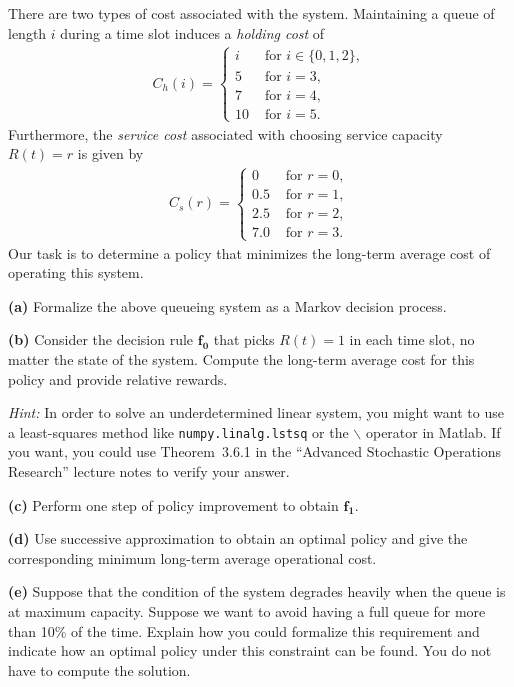 \documentclass{article}
\begin{document}
\noindent
There are two types of cost associated with the system.
Maintaining a queue of length $i$ during a time slot induces a \textit{holding cost} of 
\begin{align*}
    C_h(i) = \begin{cases}
        i & \text{ for } i \in \{ 0, 1, 2 \}, \\
        5 & \text{ for } i = 3, \\
        7 & \text{ for } i = 4, \\
        10 & \text{ for } i = 5. 
    \end{cases}
\end{align*}
Furthermore, the \textit{service cost} associated with choosing service capacity $R(t) = r$ is given by
\begin{align*}
    C_s(r) = \begin{cases}
        0 & \text{ for } r = 0 , \\
        0.5 & \text{ for } r = 1 , \\
        2.5 & \text{ for } r = 2 , \\
        7.0 & \text{ for } r = 3 .
    \end{cases}
\end{align*}
Our task is to determine a policy that minimizes the long-term average cost of operating this system.

\vspace{1em}
\noindent
\textbf{(a)}
Formalize the above queueing system as a Markov decision process.

\vspace{1em}
\noindent
\textbf{(b)}
Consider the decision rule $\mathbf{f_0}$ that picks $R(t) = 1$ in each time slot, no matter the state of the system.
Compute the long-term average cost for this policy and provide relative rewards.

\vspace{0.2em}
\noindent
\textit{Hint:} In order to solve an underdetermined linear system, you might want to use a least-squares method like \texttt{numpy.linalg.lstsq} or the $\backslash$ operator in Matlab.
If you want, you could use Theorem~3.6.1 in the ``Advanced Stochastic Operations Research'' lecture notes to verify your answer.

\vspace{1em}
\noindent
\textbf{(c)}
Perform one step of policy improvement to obtain $\mathbf{f_1}$.

\vspace{1em}
\noindent
\textbf{(d)}
Use successive approximation to obtain an optimal policy and give the corresponding minimum long-term average operational cost.

\vspace{1em}
\noindent
\textbf{(e)}
Suppose that the condition of the system degrades heavily when the queue is at maximum capacity.
Suppose we want to avoid having a full queue for more than 10\% of the time.
Explain how you could formalize this requirement and indicate how an optimal policy under this constraint can be found.
You do not have to compute the solution.
\end{document}
